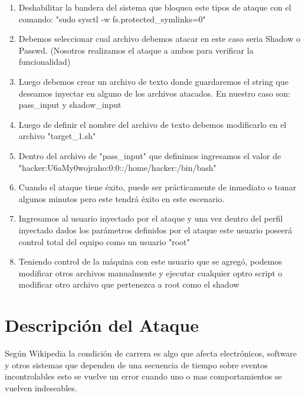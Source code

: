 \documentclass{article}
\begin{document}
\begin{enumerate}
  \item Deshabilitar la bandera del sistema que bloquea este tipos de ataque con el comando: "sudo sysctl -w fs.protected\_symlinks=0"
  \item Debemos seleccionar cual archivo debemos atacar en este caso seria Shadow o Passwd. (Nosotros realizamos el ataque a ambos para verificar la funcionalidad)
  
  \item Luego debemos crear un archivo de texto donde guardaremos el string que deseamos inyectar en alguno de los archivos atacados. En nuestro caso son: pass\_input y shadow\_input
  
  \item Luego de definir el nombre del archivo de texto debemos modificarlo en el archivo "target\_1.sh"
  
  \item Dentro del archivo de "pass\_input" que definimos ingresamos el valor de "hacker:U6aMy0wojraho:0:0::/home/hacker:/bin/bash"
  
  \item Cuando el ataque tiene éxito, puede ser prácticamente de inmediato o tomar algunos minutos pero este tendrá éxito en este escenario.
  
  \item Ingresamos al usuario inyectado por el ataque y una vez dentro del perfil inyectado dados los parámetros definidos por el ataque este usuario poseerá control total del equipo como un usuario "root"
  
  \item Teniendo control de la máquina con este usuario que se agregó, podemos modificar otros archivos manualmente y ejecutar cualquier optro script o modificar otro archivo que pertenezca a root como el shadow 
  
\end{enumerate}


\section*{Descripción del Ataque}

\tab \qquad Según Wikipedia la condición de carrera es algo que afecta electrónicos, software y otros sistemas que dependen de una secuencia de tiempo sobre eventos incontrolables esto se vuelve un error cuando uno o mas comportamientos se vuelven indeseables.
\\
\end{document}
